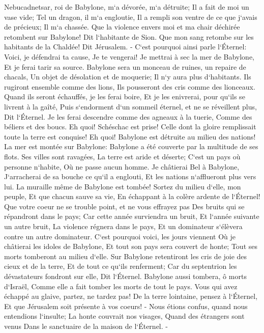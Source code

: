 \verse Nebucadnetsar, roi de Babylone, m`a dévorée, m`a détruite; Il a fait de moi un vase vide; Tel un dragon, il m`a engloutie, Il a rempli son ventre de ce que j`avais de précieux; Il m`a chassée. 
\verse Que la violence envers moi et ma chair déchirée retombent sur Babylone! Dit l`habitante de Sion. Que mon sang retombe sur les habitants de la Chaldée! Dit Jérusalem. - 
\verse C`est pourquoi ainsi parle l`Éternel: Voici, je défendrai ta cause, Je te vengerai! Je mettrai à sec la mer de Babylone, Et je ferai tarir sa source. 
\verse Babylone sera un monceau de ruines, un repaire de chacals, Un objet de désolation et de moquerie; Il n`y aura plus d`habitants. 
\verse Ils rugiront ensemble comme des lions, Ils pousseront des cris comme des lionceaux. 
\verse Quand ils seront échauffés, je les ferai boire, Et je les enivrerai, pour qu`ils se livrent à la gaîté, Puis s`endorment d`un sommeil éternel, et ne se réveillent plus, Dit l`Éternel. 
\verse Je les ferai descendre comme des agneaux à la tuerie, Comme des béliers et des boucs. 
\verse Eh quoi! Schéschac est prise! Celle dont la gloire remplissait toute la terre est conquise! Eh quoi! Babylone est détruite au milieu des nations! 
\verse La mer est montée sur Babylone: Babylone a été couverte par la multitude de ses flots. 
\verse Ses villes sont ravagées, La terre est aride et déserte; C`est un pays où personne n`habite, Où ne passe aucun homme. 
\verse Je châtierai Bel à Babylone, J`arracherai de sa bouche ce qu`il a englouti, Et les nations n`afflueront plus vers lui. La muraille même de Babylone est tombée! 
\verse Sortez du milieu d`elle, mon peuple, Et que chacun sauve sa vie, En échappant à la colère ardente de l`Éternel! 
\verse Que votre coeur ne se trouble point, et ne vous effrayez pas Des bruits qui se répandront dans le pays; Car cette année surviendra un bruit, Et l`année suivante un autre bruit, La violence régnera dans le pays, Et un dominateur s`élèvera contre un autre dominateur. 
\verse C`est pourquoi voici, les jours viennent Où je châtierai les idoles de Babylone, Et tout son pays sera couvert de honte; Tout ses morts tomberont au milieu d`elle. 
\verse Sur Babylone retentiront les cris de joie des cieux et de la terre, Et de tout ce qu`ils renferment; Car du septentrion les dévastateurs fondront sur elle, Dit l`Éternel. 
\verse Babylone aussi tombera, ô morts d`Israël, Comme elle a fait tomber les morts de tout le pays. 
\verse Vous qui avez échappé au glaive, partez, ne tardez pas! De la terre lointaine, pensez à l`Éternel, Et que Jérusalem soit présente à vos coeurs! - 
\verse Nous étions confus, quand nous entendions l`insulte; La honte couvrait nos visages, Quand des étrangers sont venus Dans le sanctuaire de la maison de l`Éternel. - 

